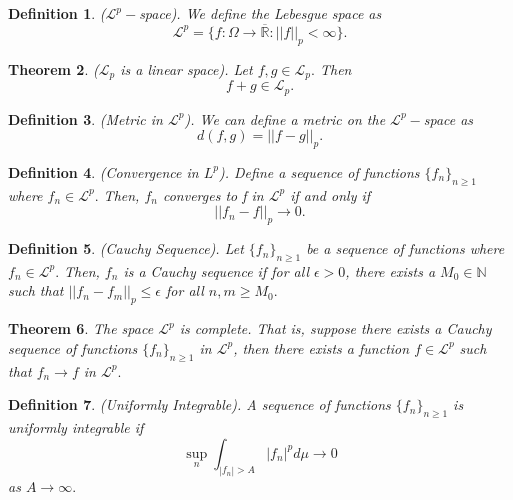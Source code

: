\documentclass[twoside]{article}
\newcounter{lecnum}
\newtheorem{theorem}{Theorem}[lecnum]
\newtheorem{definition}[theorem]{Definition}
\begin{document}
\begin{definition}($\mathcal{L}^p-$space). We define the Lebesgue space as
$$
\mathcal{L}^p = \{f: \Omega \rightarrow \overline{\mathbb{R}}: ||f||_p < \infty\}.
$$
\end{definition}

\begin{theorem}($\mathcal{L}_p$ is a linear space). Let $f,g \in \mathcal{L}_p.$ Then 
$$
f + g \in \mathcal{L}_p.
$$
\end{theorem}

\begin{definition}(Metric in $\mathcal{L}^p$). We can define a metric on the $\mathcal{L}^p-$space as 
$$
d(f,g) = ||f - g||_p.
$$
\end{definition}

\begin{definition}(Convergence in $L^p$). Define a sequence of functions $\{f_n\}_{n \geq 1}$ where $f_n \in \mathcal{L}^p.$ Then, $f_n$ converges to f in $\mathcal{L}^p$ if and only if 
$$
||f_n - f||_p \rightarrow 0.
$$
\end{definition}

\begin{definition}(Cauchy Sequence). Let $\{f_n\}_{n \geq 1}$ be a sequence of functions where $f_n \in \mathcal{L}^p.$ Then, $f_n$ is a Cauchy sequence if for all $\epsilon > 0$, there exists a $M_0 \in \mathbb{N}$ such that $||f_n - f_m||_p \leq \epsilon$ for all $n,m \geq M_0.$
\end{definition}

\begin{theorem}The space $\mathcal{L}^p$ is complete. That is, suppose there exists a Cauchy sequence of functions $\{f_n\}_{n \geq 1}$ in $\mathcal{L}^p$, then there exists a function $f \in \mathcal{L}^p$ such that $f_n \rightarrow f$ in $\mathcal{L}^p.$
\end{theorem}


\begin{definition}(Uniformly Integrable). A sequence of functions $\{f_n\}_{n \geq 1}$ is uniformly integrable if 
$$
\sup_{n}\int_{|f_n| > A}|f_n|^pd\mu \rightarrow 0
$$
as $A \rightarrow \infty.$
\end{definition}
\end{document}
